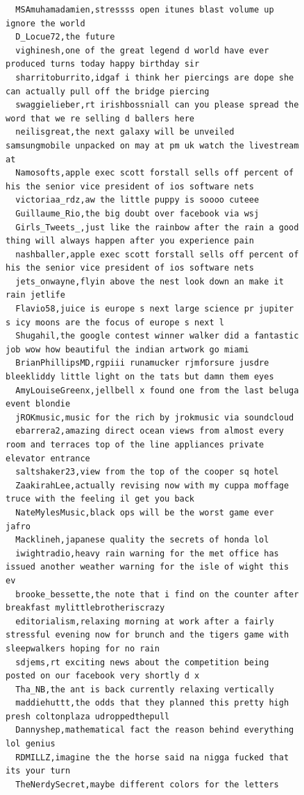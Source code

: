 \begin{figure}[htpb]
\begin{verbatim}
  MSAmuhamadamien,stressss open itunes blast volume up ignore the world
  D_Locue72,the future
  vighinesh,one of the great legend d world have ever produced turns today happy birthday sir
  sharritoburrito,idgaf i think her piercings are dope she can actually pull off the bridge piercing
  swaggielieber,rt irishbossniall can you please spread the word that we re selling d ballers here
  neilisgreat,the next galaxy will be unveiled samsungmobile unpacked on may at pm uk watch the livestream at
  Namosofts,apple exec scott forstall sells off percent of his the senior vice president of ios software nets
  victoriaa_rdz,aw the little puppy is soooo cuteee
  Guillaume_Rio,the big doubt over facebook via wsj
  Girls_Tweets_,just like the rainbow after the rain a good thing will always happen after you experience pain
  nashballer,apple exec scott forstall sells off percent of his the senior vice president of ios software nets
  jets_onwayne,flyin above the nest look down an make it rain jetlife
  Flavio58,juice is europe s next large science pr jupiter s icy moons are the focus of europe s next l
  Shugahil,the google contest winner walker did a fantastic job wow how beautiful the indian artwork go miami
  BrianPhillipsMD,rgpiii runamucker rjmforsure jusdre bleekliddy little light on the tats but damn them eyes
  AmyLouiseGreenx,jellbell x found one from the last beluga event blondie
  jROKmusic,music for the rich by jrokmusic via soundcloud
  ebarrera2,amazing direct ocean views from almost every room and terraces top of the line appliances private elevator entrance
  saltshaker23,view from the top of the cooper sq hotel
  ZaakirahLee,actually revising now with my cuppa moffage truce with the feeling il get you back
  NateMylesMusic,black ops will be the worst game ever jafro
  Macklineh,japanese quality the secrets of honda lol
  iwightradio,heavy rain warning for the met office has issued another weather warning for the isle of wight this ev
  brooke_bessette,the note that i find on the counter after breakfast mylittlebrotheriscrazy
  editorialism,relaxing morning at work after a fairly stressful evening now for brunch and the tigers game with sleepwalkers hoping for no rain
  sdjems,rt exciting news about the competition being posted on our facebook very shortly d x
  Tha_NB,the ant is back currently relaxing vertically
  maddiehuttt,the odds that they planned this pretty high presh coltonplaza udroppedthepull
  Dannyshep,mathematical fact the reason behind everything lol genius
  RDMILLZ,imagine the the horse said na nigga fucked that its your turn
  TheNerdySecret,maybe different colors for the letters

\end{verbatim}
\end{figure}
